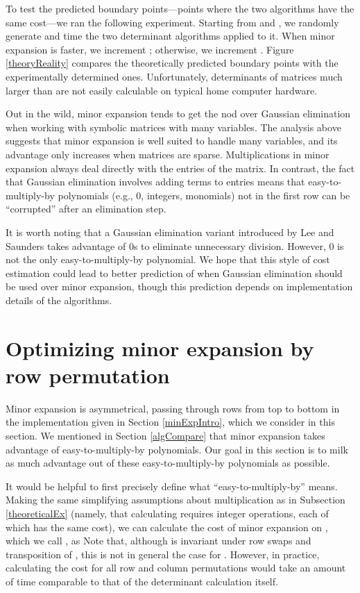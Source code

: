 \documentclass[12pt]{amsart}
\numberwithin{equation}{section}
\numberwithin{figure}{section}
\newcommand{\eq}[2][]{\ifthenelse{\equal{#1}{}}{\eqNoNum{#2}}{\eqNum{\label{#1}
#2}\\}}
\newcommand{\eqNoNum}[1]{}
\newcommand{\eqNum}[2]{}
\newcommand{\lrparen}[2][1]{\ifthenelse{\equal{#1}{1}}{(#2)}{\left(#2\right)}}
\DeclareMathOperator{\subop}{sub}
\newcommand{\sub}[4][1]{\subop\lrparen[#1]{#2, #3, #4}}
\DeclareMathOperator{\detop}{det}
\renewcommand{\det}[2][1]{\detop\lrparen[#1]{#2}}
\newcommand{\smin}{\setminus}
\newcommand{\nterms}[2][1]{T\lrparen[#1]{#2}}
\begin{document}
To test the predicted boundary points---points where the two algorithms have the same cost---we ran the following experiment. Starting from  and , we randomly generate  and time the two determinant algorithms applied to it. When minor expansion is faster, we increment ; otherwise, we increment . Figure \ref{theoryReality} compares the theoretically predicted boundary points with the experimentally determined ones. Unfortunately, determinants of matrices much larger than  are not easily calculable on typical home computer hardware.

Out in the wild, minor expansion tends to get the nod over Gaussian elimination when working with symbolic matrices with many variables. The analysis above suggests that minor expansion is well suited to handle many variables, and its advantage only increases when matrices are sparse. Multiplications in minor expansion always deal directly with the entries of the matrix. In contrast, the fact that Gaussian elimination involves adding terms to entries means that easy-to-multiply-by polynomials (e.g., 0, integers, monomials) not in the first row can be ``corrupted'' after an elimination step.

It is worth noting that a Gaussian elimination variant introduced by Lee and Saunders \cite{lee-saunders} takes advantage of 0s to eliminate unnecessary division. However, 0 is not the only easy-to-multiply-by polynomial. We hope that this style of cost estimation could lead to better prediction of when Gaussian elimination should be used over minor expansion, though this prediction depends on implementation details of the algorithms.


\section{Optimizing minor expansion by row permutation}\label{algOptimize}
Minor expansion is asymmetrical, passing through rows from top to bottom in the implementation given in Section \ref{minExpIntro}, which we consider in this section. We mentioned in Section \ref{algCompare} that minor expansion takes advantage of easy-to-multiply-by polynomials. Our goal in this section is to milk as much advantage out of these easy-to-multiply-by polynomials as possible.

It would be helpful to first precisely define what ``easy-to-multiply-by'' means. Making the same simplifying assumptions about multiplication as in Subsection \ref{theoreticalEx} (namely, that calculating  requires  integer operations, each of which has the same cost), we can calculate the cost of minor expansion on , which we call , as
\eq{
C_M(A) = \sum_{J \subseteq [n]}\sum_{j \in J}\nterms{a_{|J|j}}\nterms{\det{\sub{A}{[|J|-1]}{J \smin \{j\}}}}.
}
Note that, although  is invariant under row swaps and transposition of , this is not in general the case for . However, in practice, calculating the cost for all  row and column permutations would take an amount of time comparable to that of the determinant calculation itself.
\end{document}
